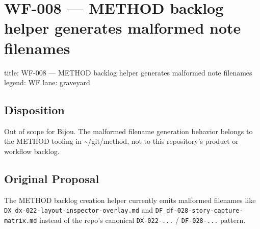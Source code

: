 \chapter{WF-008 --- METHOD backlog helper generates malformed note filenames}\label{record-406}

\smallskip

\begin{RecordMeta}
title: WF-008 — METHOD backlog helper generates malformed note filenames
legend: WF
lane: graveyard

\end{RecordMeta}

\section{Disposition}\label{record-406-disposition}

Out of scope for Bijou. The malformed filename generation behavior belongs to the METHOD tooling in \textasciitilde/git/method, not to this repository's product or workflow backlog.

\section{Original Proposal}\label{record-406-original-proposal}

The METHOD backlog creation helper currently emits malformed filenames like \texttt{D\allowbreak{}X\allowbreak{}\_\allowbreak{}d\allowbreak{}x\allowbreak{}-\allowbreak{}0\allowbreak{}2\allowbreak{}2\allowbreak{}-\allowbreak{}l\allowbreak{}a\allowbreak{}y\allowbreak{}o\allowbreak{}u\allowbreak{}t\allowbreak{}-\allowbreak{}i\allowbreak{}n\allowbreak{}s\allowbreak{}p\allowbreak{}e\allowbreak{}c\allowbreak{}t\allowbreak{}o\allowbreak{}r\allowbreak{}-\allowbreak{}o\allowbreak{}v\allowbreak{}e\allowbreak{}r\allowbreak{}l\allowbreak{}a\allowbreak{}y\allowbreak{}.\allowbreak{}m\allowbreak{}d} and \texttt{D\allowbreak{}F\allowbreak{}\_\allowbreak{}d\allowbreak{}f\allowbreak{}-\allowbreak{}0\allowbreak{}2\allowbreak{}8\allowbreak{}-\allowbreak{}s\allowbreak{}t\allowbreak{}o\allowbreak{}r\allowbreak{}y\allowbreak{}-\allowbreak{}c\allowbreak{}a\allowbreak{}p\allowbreak{}t\allowbreak{}u\allowbreak{}r\allowbreak{}e\allowbreak{}-\allowbreak{}m\allowbreak{}a\allowbreak{}t\allowbreak{}r\allowbreak{}i\allowbreak{}x\allowbreak{}.\allowbreak{}m\allowbreak{}d} instead of the repo's canonical \texttt{D\allowbreak{}X\allowbreak{}-\allowbreak{}0\allowbreak{}2\allowbreak{}2\allowbreak{}-\allowbreak{}.\allowbreak{}.\allowbreak{}.} / \texttt{D\allowbreak{}F\allowbreak{}-\allowbreak{}0\allowbreak{}2\allowbreak{}8\allowbreak{}-\allowbreak{}.\allowbreak{}.\allowbreak{}.} pattern.

